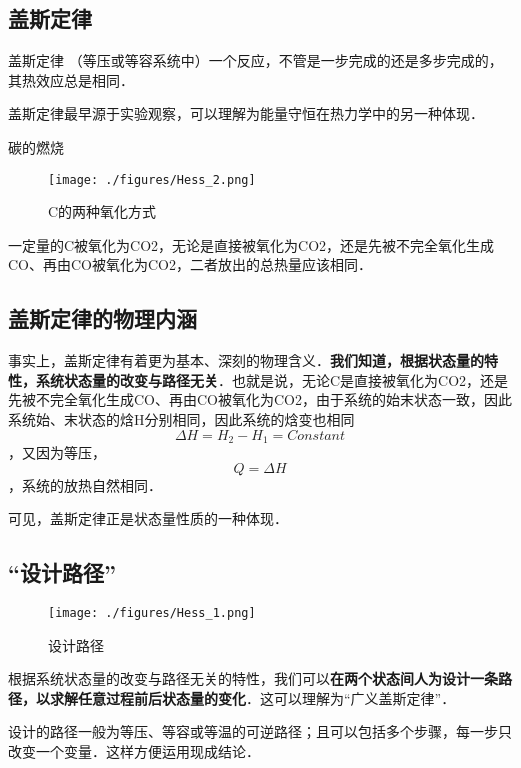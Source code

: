 
\subsection{盖斯定律}
\begin{theorem}{盖斯定律}
（等压或等容系统中）一个反应，不管是一步完成的还是多步完成的，其热效应总是相同．
\end{theorem}
盖斯定律最早源于实验观察，可以理解为能量守恒在热力学中的另一种体现．

\begin{example}{碳的燃烧}
\begin{figure}[ht]
\centering
\texttt{[image: ./figures/Hess\_2.png]}
\caption{C的两种氧化方式} \label{Hess_fig2}
\end{figure}
一定量的C被氧化为CO2，无论是直接被氧化为CO2，还是先被不完全氧化生成CO、再由CO被氧化为CO2，二者放出的总热量应该相同．
\end{example}

\subsection{盖斯定律的物理内涵}
事实上，盖斯定律有着更为基本、深刻的物理含义．\textbf{我们知道，根据状态量的特性，系统状态量的改变与路径无关}．也就是说，无论C是直接被氧化为CO2，还是先被不完全氧化生成CO、再由CO被氧化为CO2，由于系统的始末状态一致，因此系统始、末状态的焓H分别相同，因此系统的焓变也相同$$\Delta H=H_2-H_1=Constant$$，又因为等压，$$Q=\Delta H$$，系统的放热自然相同．

可见，盖斯定律正是状态量性质的一种体现．

\subsection{“设计路径”}
\begin{figure}[ht]
\centering
\texttt{[image: ./figures/Hess\_1.png]}
\caption{设计路径} \label{Hess_fig1}
\end{figure}

根据系统状态量的改变与路径无关的特性，我们可以\textbf{在两个状态间人为设计一条路径，以求解任意过程前后状态量的变化}．这可以理解为“广义盖斯定律”．

设计的路径一般为等压、等容或等温的可逆路径；且可以包括多个步骤，每一步只改变一个变量．这样方便运用现成结论．

